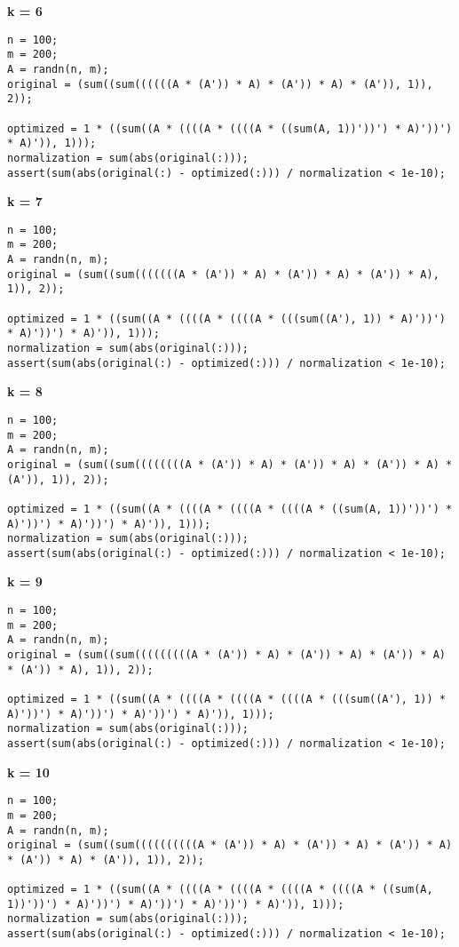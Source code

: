 {\bf k = 6}

\begin{lstlisting}
n = 100;
m = 200;
A = randn(n, m);
original = (sum((sum((((((A * (A')) * A) * (A')) * A) * (A')), 1)), 2));

optimized = 1 * ((sum((A * ((((A * ((((A * ((sum(A, 1))'))') * A)'))') * A)')), 1)));
normalization = sum(abs(original(:)));
assert(sum(abs(original(:) - optimized(:))) / normalization < 1e-10);
\end{lstlisting}


{\bf k = 7}

\begin{lstlisting}
n = 100;
m = 200;
A = randn(n, m);
original = (sum((sum(((((((A * (A')) * A) * (A')) * A) * (A')) * A), 1)), 2));

optimized = 1 * ((sum((A * ((((A * ((((A * (((sum((A'), 1)) * A)'))') * A)'))') * A)')), 1)));
normalization = sum(abs(original(:)));
assert(sum(abs(original(:) - optimized(:))) / normalization < 1e-10);
\end{lstlisting}


{\bf k = 8}

\begin{lstlisting}
n = 100;
m = 200;
A = randn(n, m);
original = (sum((sum((((((((A * (A')) * A) * (A')) * A) * (A')) * A) * (A')), 1)), 2));

optimized = 1 * ((sum((A * ((((A * ((((A * ((((A * ((sum(A, 1))'))') * A)'))') * A)'))') * A)')), 1)));
normalization = sum(abs(original(:)));
assert(sum(abs(original(:) - optimized(:))) / normalization < 1e-10);
\end{lstlisting}


{\bf k = 9}

\begin{lstlisting}
n = 100;
m = 200;
A = randn(n, m);
original = (sum((sum(((((((((A * (A')) * A) * (A')) * A) * (A')) * A) * (A')) * A), 1)), 2));

optimized = 1 * ((sum((A * ((((A * ((((A * ((((A * (((sum((A'), 1)) * A)'))') * A)'))') * A)'))') * A)')), 1)));
normalization = sum(abs(original(:)));
assert(sum(abs(original(:) - optimized(:))) / normalization < 1e-10);
\end{lstlisting}


{\bf k = 10}

\begin{lstlisting}
n = 100;
m = 200;
A = randn(n, m);
original = (sum((sum((((((((((A * (A')) * A) * (A')) * A) * (A')) * A) * (A')) * A) * (A')), 1)), 2));

optimized = 1 * ((sum((A * ((((A * ((((A * ((((A * ((((A * ((sum(A, 1))'))') * A)'))') * A)'))') * A)'))') * A)')), 1)));
normalization = sum(abs(original(:)));
assert(sum(abs(original(:) - optimized(:))) / normalization < 1e-10);
\end{lstlisting}


